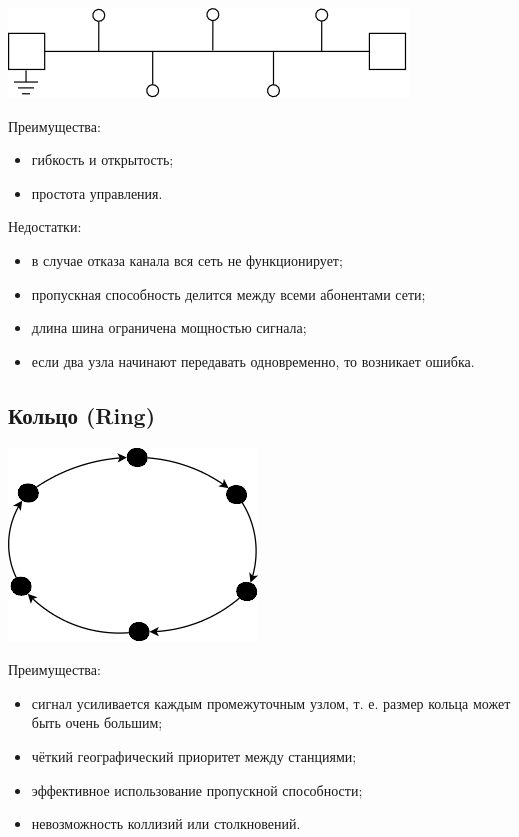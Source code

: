 \documentclass[12pt, russian, oneside, article]{ncc}
\begin{document}
\includegraphics[]{images/SiSPI/bus.png}

Преимущества:
\begin{itemize}
\item гибкость и открытость;
\item простота управления.
\end{itemize}

Недостатки:
\begin{itemize}
\item в случае отказа канала вся сеть не функционирует;
\item пропускная способность делится между всеми абонентами сети;
\item длина шина ограничена мощностью сигнала;
\item если два узла начинают передавать одновременно, то возникает ошибка.
\end{itemize}
\subsection{Кольцо (Ring)}
\label{sec-2_2}


\includegraphics[]{images/SiSPI/ring.png}

Преимущества:
\begin{itemize}
\item сигнал усиливается каждым промежуточным узлом, т. е. размер кольца может быть очень большим;
\item чёткий географический приоритет между станциями;
\item эффективное использование пропускной способности;
\item невозможность коллизий или столкновений.
\end{itemize}
\end{document}
